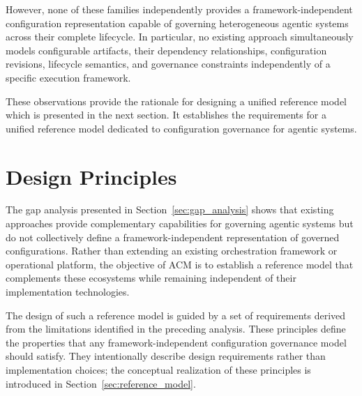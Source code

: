 \documentclass[10pt]{article}
\begin{document}
However, none of these families independently provides a framework-independent configuration representation capable of governing heterogeneous agentic systems across their complete lifecycle. In particular, no existing approach simultaneously models configurable artifacts, their dependency relationships, configuration revisions, lifecycle semantics, and governance constraints independently of a specific execution framework.

These observations provide the rationale for designing a unified reference model which is presented in the next section. It establishes the requirements for a unified reference model dedicated to configuration governance for agentic systems.

\section{Design Principles}
\label{sec:design_principles}

The gap analysis presented in Section~\ref{sec:gap_analysis} shows that existing approaches provide complementary capabilities for governing agentic systems but do not collectively define a framework-independent representation of governed configurations. Rather than extending an existing orchestration framework or operational platform, the objective of ACM is to establish a reference model that complements these ecosystems while remaining independent of their implementation technologies.

The design of such a reference model is guided by a set of requirements derived from the limitations identified in the preceding analysis. These principles define the properties that any framework-independent configuration governance model should satisfy. They intentionally describe design requirements rather than implementation choices; the conceptual realization of these principles is introduced in Section~\ref{sec:reference_model}.
\end{document}
